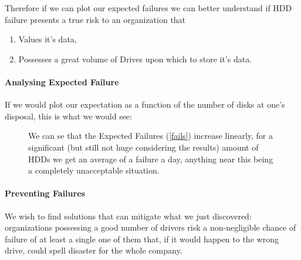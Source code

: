 \documentclass[openright, twoside]{report}
\theoremstyle{definition}
\theoremstyle{example}
\newcommand{\vertLineFromPoint}[1]{
  \draw[dashed] 
  (#1) -- (#1|-{rel axis cs:0,0})
}
\newcommand{\horLineFromPoint}[1]{
  \draw[dashed] 
  (#1) -- (#1-|{rel axis cs:0,0})
}
\begin{document}
Therefore if we can plot our expected failures we can better understand if 
HDD failure presents a true risk to an organization that 

\begin{enumerate}
	\item Values it's data,
	\item Possesses a great volume of Drives upon which to store it's data.
\end{enumerate}
\clearpage

\paragraph{Analysing Expected Failure}
If we would plot our expectation as a function of the number of disks at one's disposal, this
is what we would see:

\begin{figure}[ht]
\begin{center}
	

	\caption{We can se that the Expected Failures (\ref{fails}) increase linearly, for a significant 
	(but still not huge considering the results) amount of HDDs we get an average of a failure a day,
	anything near this being a completely unacceptable situation.}
\end{center}
	\label{fig:fails}
\end{figure}

\paragraph{Preventing Failures}
We wish to find solutions that can mitigate what we just discovered: organizations 
possessing a good number of drivers risk a non-negligible chance of failure of at 
least a single one of them that, if 
it would happen to the wrong drive, could spell disaster for the whole company.
\end{document}
